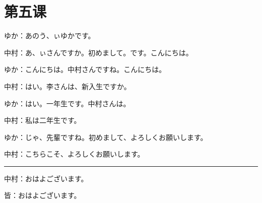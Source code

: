 \langJP

\section{第五课 }

ゆか：あのう、ぃゆかです。

中村：あ、ぃさんですか。初めまして。です。こんにちは。

ゆか：こんにちは。中村さんですね。こんにちは。

中村：はい。李さんは、新入生ですか。

ゆか：はい。一年生です。中村さんは。

中村：私は二年生です。

ゆか：じゃ、先輩ですね。初めまして、よろしくお願いします。

中村：こちらこそ、よろしくお願いします。

\rule{5cm}{1pt}

中村：おはよございます。

皆：おはよございます。
